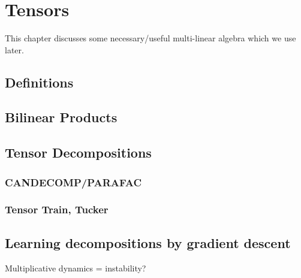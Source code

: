 \chapter{Tensors}\label{C:tens}

This chapter discusses some necessary/useful multi-linear algebra which we use later.

\section{Definitions}

\section{Bilinear Products}

\section{Tensor Decompositions}
\subsection{CANDECOMP/PARAFAC}
\subsection{Tensor Train, Tucker}

\section{Learning decompositions by gradient descent}
Multiplicative dynamics = instability?